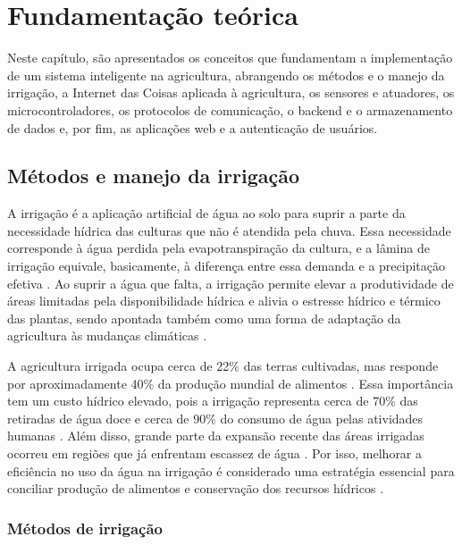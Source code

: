 \chapter{Fundamentação teórica}
\label{textuais/cap1}

\providecommand{\preencher}[1]{\textcolor{red}{[#1]}}
\providecommand{\figuraprovisoria}[2]{\fbox{\parbox[c][#1][c]{0.9\textwidth}{\centering\textcolor{red}{#2}}}}

Neste capítulo, são apresentados os conceitos que fundamentam a implementação de um sistema inteligente na agricultura, abrangendo os métodos e o manejo da irrigação, a Internet das Coisas aplicada à agricultura, os sensores e atuadores, os microcontroladores, os protocolos de comunicação, o backend e o armazenamento de dados e, por fim, as aplicações web e a autenticação de usuários.

\section{Métodos e manejo da irrigação}

A irrigação é a aplicação artificial de água ao solo para suprir a parte da
necessidade hídrica das culturas que não é atendida pela chuva. Essa necessidade corresponde à água perdida pela evapotranspiração da cultura, e a lâmina de irrigação equivale, basicamente, à diferença entre essa demanda e a precipitação efetiva \cite{allen1998}. Ao suprir a água que falta, a irrigação permite elevar a produtividade de áreas limitadas pela disponibilidade hídrica e alivia o estresse hídrico e térmico das plantas, sendo apontada também como uma forma de adaptação da agricultura às mudanças climáticas \cite{rosa2022}.
 
A agricultura irrigada ocupa cerca de 22\% das terras cultivadas, mas responde por aproximadamente 40\% da produção mundial de alimentos \cite{rosa2022}. Essa importância tem um custo hídrico elevado, pois a irrigação representa cerca de 70\% das retiradas de água doce e cerca de 90\% do consumo de água pelas atividades humanas \cite{mcdermid2023}. Além disso, grande parte da expansão recente das áreas irrigadas ocorreu em regiões que já enfrentam escassez de água \cite{mehta2024}. Por isso, melhorar a eficiência no uso da água na irrigação é considerado uma estratégia essencial para conciliar produção de alimentos e conservação dos recursos hídricos \cite{ingrao2023}.
 

\subsection{Métodos de irrigação}

